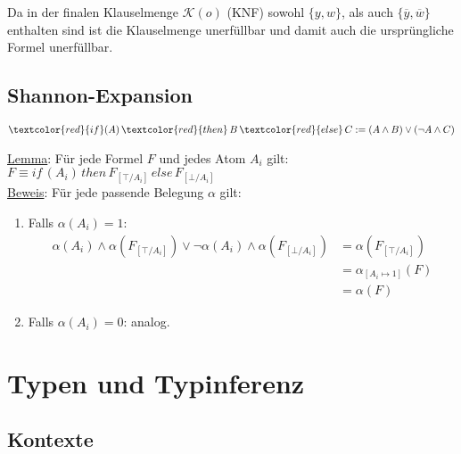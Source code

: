 \documentclass{scrartcl}
\begin{document}
Da in der finalen Klauselmenge $ \mathcal{K}(o) $ (KNF) sowohl $ \{ y,w \} $, als auch $ \{ \overline{y},\overline{w} \} $ enthalten sind ist die Klauselmenge unerfüllbar und damit auch die ursprüngliche Formel unerfüllbar.

\pagebreak
\subsection{Shannon-Expansion}

\begin{align*}
	\textcolor{red}{if}(A) \, \textcolor{red}{then} \, B \, \textcolor{red}{else} \, C := (A \wedge B) \vee (\neg A \wedge C)
\end{align*}

\underline{Lemma}: Für jede Formel $ F $ und jedes Atom $ A_i $ gilt: $ F \equiv if \, (A_i) \, then \, F_{[\top / A_i]} \, else \, F_{[\bot / A_i]} $ \\

\underline{Beweis}: Für jede passende Belegung $ \alpha $ gilt:

\begin{enumerate}
	\item Falls $ \alpha(A_i) = 1 $:
	\begin{align*}
		\alpha(A_i) \wedge \alpha(F_{[\top / A_i]}) \vee \neg \alpha(A_i) \wedge \alpha(F_{[\bot / A_i]}) &= \alpha(F_{[\top / A_i]}) \\
		&= \alpha_{[A_i \mapsto 1]}(F) \\
		&= \alpha(F)
	\end{align*}
	\item Falls $ \alpha(A_i) = 0 $: analog.
\end{enumerate}

\section{Typen und Typinferenz}

\subsection{Kontexte}
\end{document}
